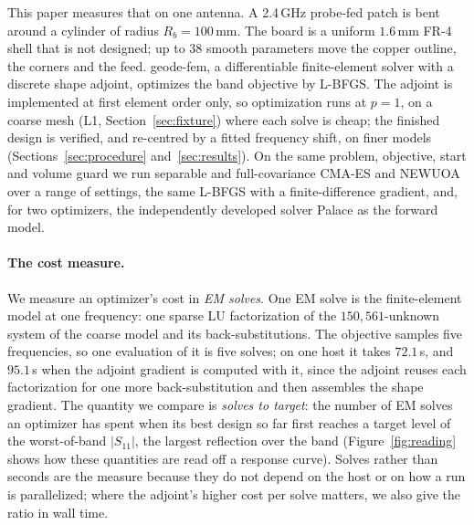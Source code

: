 \documentclass{anvil-paper}
\begin{document}
This paper measures that on one antenna. A 2.4\,GHz probe-fed patch is bent
around a cylinder of radius $R_b = 100$\,mm. The board is a uniform
$1.6$\,mm FR-4 shell that is not designed; up to 38 smooth parameters move
the copper outline, the corners and the feed. geode-fem, a differentiable
finite-element solver with a discrete shape adjoint, optimizes the band
objective by L-BFGS. The adjoint is implemented at first element order only,
so optimization runs at $p = 1$, on a coarse mesh (L1,
Section~\ref{sec:fixture}) where each solve is cheap; the finished design is
verified, and re-centred by a fitted frequency shift, on finer models
(Sections~\ref{sec:procedure} and~\ref{sec:results}). On the
same problem, objective, start and volume guard we run separable and full-covariance CMA-ES
\citep{hansen2001cmaes,ros2008separable} and NEWUOA
\citep{powell2006newuoa,zhang2023prima} over a range of settings, the same
L-BFGS with a finite-difference gradient, and, for two optimizers, the
independently developed solver Palace \citep{palace} as the forward model.

\paragraph{The cost measure.}
We measure an optimizer's cost in \emph{EM solves}. One EM solve is the
finite-element model at one frequency: one sparse LU factorization of the
$150{,}561$-unknown system of the coarse model and its back-substitutions.
The objective samples five frequencies, so one evaluation of it is five
solves; on one host it takes $72.1$\,s, and $95.1$\,s when the adjoint
gradient is computed with it, since the adjoint reuses each factorization for
one more back-substitution and then assembles the shape gradient. The quantity we compare is \emph{solves to
target}: the number of EM solves an optimizer has spent when its best design
so far first reaches a target level of the worst-of-band $|S_{11}|$, the
largest reflection over the band (Figure~\ref{fig:reading} shows how these
quantities are read off a response curve). Solves rather than seconds are the
measure because they do not depend on the host or on how a run is
parallelized; where the adjoint's higher cost per solve matters, we also
give the ratio in wall time.
\end{document}
